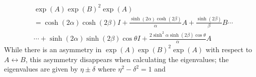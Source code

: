 \documentclass[notitlepage, 10pt]{article}
\begin{document}
\begin{align}
    &\exp(A)\exp(B)^2\exp(A)\\
    &= \cosh(2 \alpha) \cosh(2 \beta) I + \frac{\sinh (2\alpha) \cosh (2\beta)}{\alpha} A + \frac{\sinh(2\beta)}{\beta} B\cdots\\
    &\cdots+\sinh (2\alpha) \sinh (2\beta)\cos \theta I+ \frac{2\sinh^2 \alpha \sinh (2\beta) \cos \theta}{\alpha}A
\end{align}
While there is an asymmetry in $\exp(A)\exp(B)^2\exp(A)$ with respect to $A \leftrightarrow B$, this asymmetry disappears when calculating the eigenvalues; the eigenvalues are given by $\eta\pm\delta$ where $\eta^2 - \delta^2 = 1$ and
\end{document}
